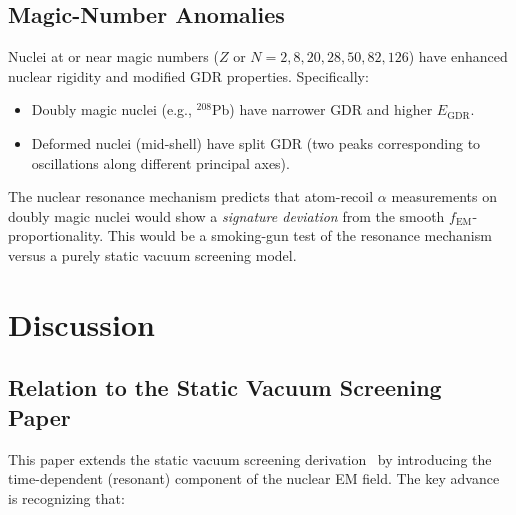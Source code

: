 \documentclass[aps,prd,twocolumn,superscriptaddress,nofootinbib]{revtex4-2}
\newcommand{\fEM}{f_{\mathrm{EM}}}
\newcommand{\EGDR}{E_{\mathrm{GDR}}}
\begin{document}
\subsection{Magic-Number Anomalies}
\label{sec:magic}

Nuclei at or near magic numbers ($Z$ or $N = 2, 8, 20, 28, 50, 82,
126$) have enhanced nuclear rigidity and modified GDR properties.
Specifically:

\begin{itemize}[nosep]
\item Doubly magic nuclei (e.g., $^{208}$Pb) have narrower GDR
and higher $\EGDR$.
\item Deformed nuclei (mid-shell) have split GDR (two peaks
corresponding to oscillations along different principal axes).
\end{itemize}

The nuclear resonance mechanism predicts that atom-recoil
$\alpha$ measurements on doubly magic nuclei would show a
\emph{signature deviation} from the smooth $\fEM$-proportionality.
This would be a smoking-gun test of the resonance mechanism versus a
purely static vacuum screening model.


\section{Discussion}
\label{sec:discussion}

\subsection{Relation to the Static Vacuum Screening Paper}
\label{sec:relation}

This paper extends the static vacuum screening
derivation~\cite{Alcock2026VS} by introducing the time-dependent
(resonant) component of the nuclear EM field.  The key advance is
recognizing that:
\end{document}
